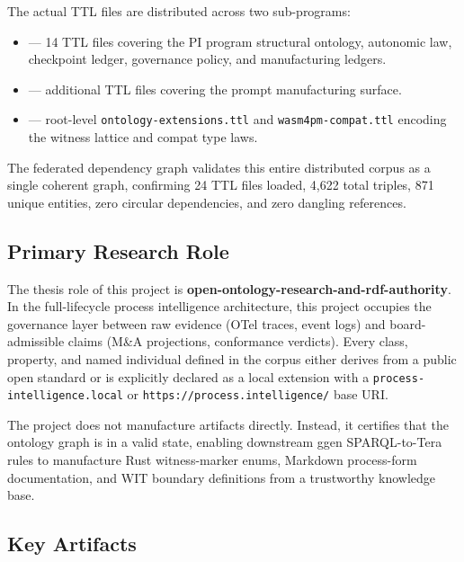 The actual TTL files are distributed across two sub-programs:
\begin{itemize}
  \item {} --- 14 TTL files covering the PI program
        structural ontology, autonomic law, checkpoint ledger, governance policy, and
        manufacturing ledgers.
  \item {} --- additional TTL files covering
        the prompt manufacturing surface.
  \item {} --- root-level \texttt{ontology-extensions.ttl} and
        \texttt{wasm4pm-compat.ttl} encoding the witness lattice and compat type laws.
\end{itemize}

The federated dependency graph validates this entire distributed corpus as a single coherent
graph, confirming 24 TTL files loaded, 4{,}622 total triples, 871 unique entities, zero
circular dependencies, and zero dangling references.

\subsection{Primary Research Role}
\label{sec:research-open-ontologies-role}

The thesis role of this project is \textbf{open-ontology-research-and-rdf-authority}. In the
full-lifecycle process intelligence architecture, this project occupies the governance layer
between raw evidence (OTel traces, event logs) and board-admissible claims (M\&A projections,
conformance verdicts). Every class, property, and named individual defined in the corpus
either derives from a public open standard or is explicitly declared as a local extension
with a \texttt{process-intelligence.local} or \texttt{https://process.intelligence/} base URI.

The project does not manufacture artifacts directly. Instead, it certifies that the ontology
graph is in a valid state, enabling downstream ggen SPARQL-to-Tera rules to manufacture Rust
witness-marker enums, Markdown process-form documentation, and WIT boundary definitions from
a trustworthy knowledge base.

\subsection{Key Artifacts}
\label{sec:research-open-ontologies-artifacts}

